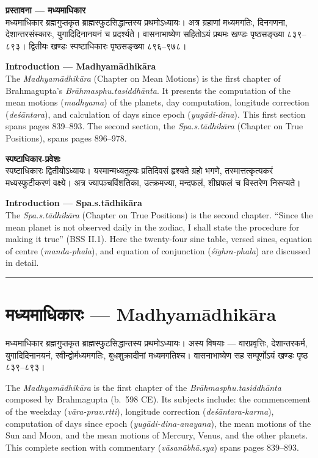 \documentclass[11pt,a4paper]{book}
\newcommand{\dev}[1]{{\devanagarifont #1}}
\newcommand{\bilingual}[2]{%
  \par\vspace{0.6em}%
  \noindent\begin{minipage}[t]{0.48\textwidth}
    \RaggedRight
    #1%
  \end{minipage}%
  \hfill
  \begin{minipage}[t]{0.48\textwidth}
    \RaggedRight
    #2%
  \end{minipage}%
  \par\vspace{0.6em}%
}
\newcommand{\secdivider}{%
  \begin{center}\rule{0.4\textwidth}{0.5pt}\end{center}%
}
\begin{document}
\bilingual{%
\textbf{\dev{प्रस्तावना --- मध्यमाधिकार}}\\[0.3em]
\dev{मध्यमाधिकार} ब्रह्मगुप्तकृत ब्राह्मस्फुटसिद्धान्तस्य प्रथमोऽध्यायः। अत्र ग्रहाणां मध्यमगतिः, दिनगणना, देशान्तरसंस्कारः, युगादिदिनानयनं च प्रदर्श्यते। वासनाभाष्येण सहितोऽयं प्रथमः खण्डः पृष्ठसङ्ख्या ८३९--८९३। द्वितीयः खण्डः \dev{स्पष्टाधिकारः} पृष्ठसङ्ख्या ८९६--९७८।
}{%
\textbf{Introduction --- Madhyamādhikāra}\\[0.3em]
The \textit{Madhyamādhikāra} (Chapter on Mean Motions) is the first chapter of Brahmagupta's \textit{Brāhmasphu.tasiddhānta}. It presents the computation of the mean motions (\textit{madhyama}) of the planets, day computation, longitude correction (\textit{deśāntara}), and calculation of days since epoch (\textit{yugādi-dina}). This first section spans pages 839--893. The second section, the \textit{Spa.s.tādhikāra} (Chapter on True Positions), spans pages 896--978.
}

\vspace{1em}

\bilingual{%
\textbf{\dev{स्पष्टाधिकार-प्रवेशः}}\\[0.3em]
\dev{स्पष्टाधिकारः} द्वितीयोऽध्यायः। यस्मान्मध्यतुल्यः प्रतिदिवसं हृश्यते ग्रहो भगणे, तस्मात्तत्कृत्यकरं मध्यस्फुटीकरणं वक्ष्ये। अत्र ज्यापञ्चविंशतिका, उत्क्रमज्या, मन्दफलं, शीघ्रफलं च विस्तरेण निरूप्यते।
}{%
\textbf{Introduction --- Spa.s.tādhikāra}\\[0.3em]
The \textit{Spa.s.tādhikāra} (Chapter on True Positions) is the second chapter. ``Since the mean planet is not observed daily in the zodiac, I shall state the procedure for making it true'' (BSS II.1). Here the twenty-four sine table, versed sines, equation of centre (\textit{manda-phala}), and equation of conjunction (\textit{śīghra-phala}) are discussed in detail.
}

\vspace{1em}
\secdivider
\clearpage

\chapter[Madhyamādhikāra]{\dev{मध्यमाधिकारः} --- Madhyamādhikāra}
\label{chap:madhyama}


\bilingual{%
\dev{मध्यमाधिकार} ब्रह्मगुप्तकृत ब्राह्मस्फुटसिद्धान्तस्य प्रथमोऽध्यायः। अस्य विषयाः --- वारप्रवृत्तिः, देशान्तरकर्म, युगादिदिनानयनं, रवीन्द्वोर्मध्यमगतिः, बुधशुक्रादीनां मध्यमगतिश्च। वासनाभाष्येण सह सम्पूर्णोऽयं खण्डः पृष्ठ ८३९--८९३।
}{%
The \textit{Madhyamādhikāra} is the first chapter of the \textit{Brāhmasphu.tasiddhānta} composed by Brahmagupta (b.~598 CE). Its subjects include: the commencement of the weekday (\textit{vāra-prav.rtti}), longitude correction (\textit{deśāntara-karma}), computation of days since epoch (\textit{yugādi-dina-anayana}), the mean motions of the Sun and Moon, and the mean motions of Mercury, Venus, and the other planets. This complete section with commentary (\textit{vāsanābhā.sya}) spans pages 839--893.
}
\end{document}
